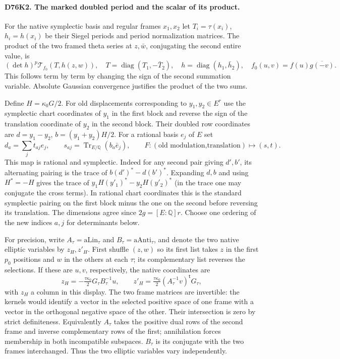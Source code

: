 \paragraph{D76K2. The marked doubled period and the scalar of its product.}
For the native symplectic basis and regular frames $x_1,x_2$ let
$T_i=\tau(x_i)$, $h_i=h(x_i)$ be their Siegel periods and period
normalization matrices. The product of the two framed theta series
at $z,\bar w$, conjugating the second entire value, is
\[
 (\det h)^p\mathcal T_{f_0}(T,h(z,w)),\quad
 T=\operatorname{diag}(T_1,-\bar T_2),\quad
 h=\operatorname{diag}(h_1,\bar h_2),\quad
 f_0(u,v)=f(u)\overline{g(-v)} .
\]
This follows term by term by changing the sign of the second
summation variable. Absolute Gaussian convergence justifies the
product of the two sums.

Define $H=\kappa_0G/2$. For old displacements corresponding to
$y_1,y_2\in E^r$ use the symplectic chart coordinates of $y_1$
in the first block and reverse the sign of the translation
coordinate of $y_2$ in the second block. Their doubled row
coordinates are $d=y_1-y_2$, $b=(y_1+y_2)H/2$. For a rational
basis $e_j$ of $E$ set
\[
 d_a=\sum_j t_{aj}e_j,\qquad
 s_{aj}=\operatorname{Tr}_{E/\mathbb Q}(b_a\bar e_j),\qquad
 F:(\text{old modulation,translation})\longmapsto(s,t).
\]
This map is rational and symplectic. Indeed for any second pair
giving $d',b'$, its alternating pairing is the trace of
$b(d')^*-d(b')^*$. Expanding $d,b$ and using $H^*=-H$ gives
the trace of $y_1H(y'_1)^*-y_2H(y'_2)^*$ (in the trace one
may conjugate the cross terms). In rational chart coordinates
this is the standard symplectic pairing on the first block
minus the one on the second before reversing its translation.
The dimensions agree since $2g=[E:\mathbb Q]r$. Choose one
ordering of the new indices $a,j$ for determinants below.

For precision, write $A_\tau=\mathrm{aLin}_\tau$ and
$B_\tau=\mathrm{aAnti}_\tau$, and denote the two native elliptic
variables by $z_H,z'_H$. First shuffle $(z,w)$ so its first list
takes $z$ in the first $p_0$ positions and $w$ in the others
at each $\tau$; its complementary list reverses the selections.
If these are $u,v$, respectively, the native coordinates are
\[
 z_H=-\tfrac{\tau\kappa_0}{2}G_\tau B_\tau^{-1}u,\qquad
 z'_H=\tfrac{\tau\kappa_0}{2}(A_\tau^{-1}v)^{\mathsf t}G_\tau ,
\]
with $z_H$ a column in this display. The two frame matrices are
invertible: the kernels would identify a vector in the selected
positive space of one frame with a vector in the orthogonal
negative space of the other. Their intersection is zero by strict
definiteness. Equivalently $A_\tau$ takes the positive dual rows
of the second frame and inverse complementary rows of the first;
annihilation forces membership in both incompatible subspaces.
$B_\tau$ is its conjugate with the two frames interchanged.
Thus the two elliptic variables vary independently.

